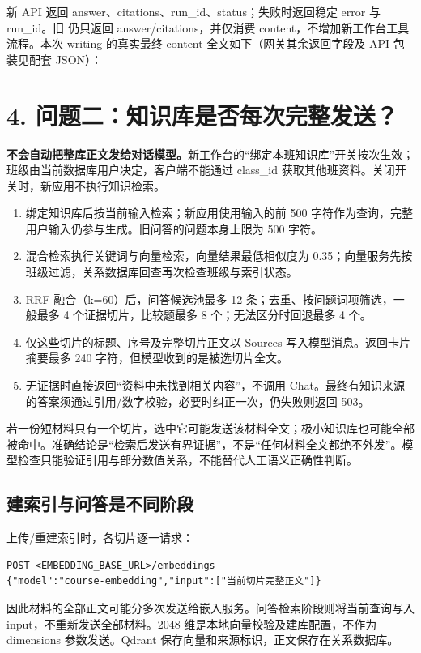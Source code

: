 \documentclass[UTF8,a4paper,10pt,fontset=fandol]{ctexart}
\newcommand{\code}[1]{\texttt{\detokenize{#1}}}
\begin{document}
新 API 返回 answer、citations、run\_id、status；失败时返回稳定 error 与 run\_id。旧 \code{/api/ask} 仍只返回 answer/citations，并仅消费 content，不增加新工作台工具流程。本次 writing 的真实最终 content 全文如下（网关其余返回字段及 API 包装见配套 JSON）：

\newpage
\section*{4. 问题二：知识库是否每次完整发送？}
\textbf{不会自动把整库正文发给对话模型。}新工作台的“绑定本班知识库”开关按次生效；班级由当前数据库用户决定，客户端不能通过 class\_id 获取其他班资料。关闭开关时，新应用不执行知识检索。

\begin{enumerate}
\item 绑定知识库后按当前输入检索；新应用使用输入的前 500 字符作为查询，完整用户输入仍参与生成。旧问答的问题本身上限为 500 字符。
\item 混合检索执行关键词与向量检索，向量结果最低相似度为 0.35；向量服务先按班级过滤，关系数据库回查再次检查班级与索引状态。
\item RRF 融合（k=60）后，问答候选池最多 12 条；去重、按问题词项筛选，一般最多 4 个证据切片，比较题最多 8 个；无法区分时回退最多 4 个。
\item 仅这些切片的标题、序号及完整切片正文以 Sources 写入模型消息。返回卡片摘要最多 240 字符，但模型收到的是被选切片全文。
\item 无证据时直接返回“资料中未找到相关内容”，不调用 Chat。最终有知识来源的答案须通过引用/数字校验，必要时纠正一次，仍失败则返回 503。
\end{enumerate}

若一份短材料只有一个切片，选中它可能发送该材料全文；极小知识库也可能全部被命中。准确结论是“检索后发送有界证据”，不是“任何材料全文都绝不外发”。模型检查只能验证引用与部分数值关系，不能替代人工语义正确性判断。

\subsection*{建索引与问答是不同阶段}
上传/重建索引时，各切片逐一请求：
\begin{Verbatim}[frame=single]
POST <EMBEDDING_BASE_URL>/embeddings
{"model":"course-embedding","input":["当前切片完整正文"]}
\end{Verbatim}
因此材料的全部正文可能分多次发送给嵌入服务。问答检索阶段则将当前查询写入 input，不重新发送全部材料。2048 维是本地向量校验及建库配置，不作为 dimensions 参数发送。Qdrant 保存向量和来源标识，正文保存在关系数据库。
\end{document}
